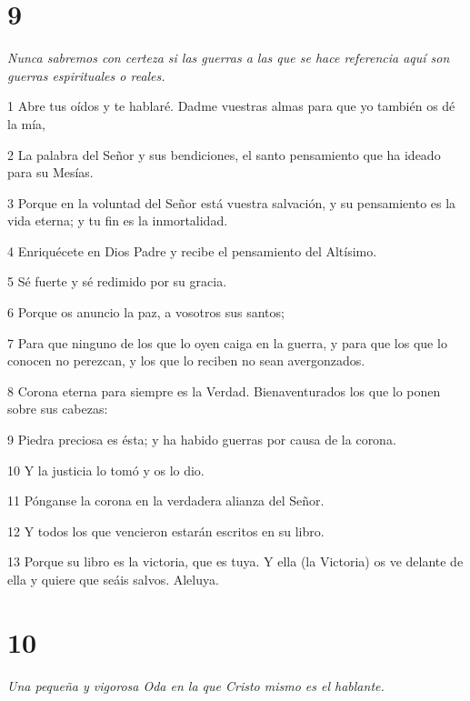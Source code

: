 \chapter{9}

\par \textit{Nunca sabremos con certeza si las guerras a las que se hace referencia aquí son guerras espirituales o reales.}

\par 1 Abre tus oídos y te hablaré. Dadme vuestras almas para que yo también os dé la mía,
\par 2 La palabra del Señor y sus bendiciones, el santo pensamiento que ha ideado para su Mesías.
\par 3 Porque en la voluntad del Señor está vuestra salvación, y su pensamiento es la vida eterna; y tu fin es la inmortalidad.
\par 4 Enriquécete en Dios Padre y recibe el pensamiento del Altísimo.
\par 5 Sé fuerte y sé redimido por su gracia.
\par 6 Porque os anuncio la paz, a vosotros sus santos;
\par 7 Para que ninguno de los que lo oyen caiga en la guerra, y para que los que lo conocen no perezcan, y los que lo reciben no sean avergonzados.
\par 8 Corona eterna para siempre es la Verdad. Bienaventurados los que lo ponen sobre sus cabezas:
\par 9 Piedra preciosa es ésta; y ha habido guerras por causa de la corona.
\par 10 Y la justicia lo tomó y os lo dio.
\par 11 Pónganse la corona en la verdadera alianza del Señor.
\par 12 Y todos los que vencieron estarán escritos en su libro.
\par 13 Porque su libro es la victoria, que es tuya. Y ella (la Victoria) os ve delante de ella y quiere que seáis salvos. Aleluya.

\chapter{10}

\par \textit{Una pequeña y vigorosa Oda en la que Cristo mismo es el hablante.}

